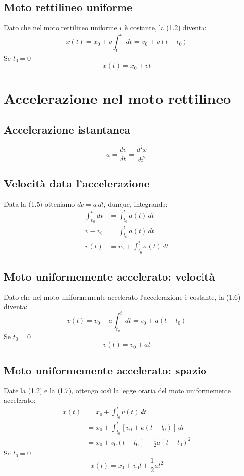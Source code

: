 \documentclass{report}
\begin{document}
\subsection{Moto rettilineo uniforme}
Dato che nel moto rettilineo uniforme \(v\) è costante, la (1.2) diventa:
\begin{equation}
    x(t) = x_0 + v \int_{t_0}^{t}\,dt = x_0 + v(t - t_0)
\end{equation}
Se \(t_0 = 0\)
\begin{equation*}
    x(t) = x_0 + vt
\end{equation*}

\section{Accelerazione nel moto rettilineo}
\subsection{Accelerazione istantanea}
\begin{equation}
    a = \frac{dv}{dt} = \frac{d^{2}x}{dt^2}
\end{equation}
\subsection{Velocità data l'accelerazione}
Data la (1.5) otteniamo \(dv = a\,dt\), dunque, integrando:
\begin{align}
    \int_{v_0}^{v}dv & = \int_{t_0}^{t}a(t)\,dt \nonumber \\
    v - v_0 & = \int_{t_0}^{t}a(t)\,dt \nonumber \\
    v(t) & = v_0 + \int_{t_0}^{t}a(t)\,dt
\end{align}
\subsection{Moto uniformemente accelerato: velocità}
Dato che nel moto uniformemente accelerato l'accelerazione è costante, 
la (1.6) diventa:
\begin{equation}
    v(t) = v_0 + a \int_{t_0}^{t}dt = v_0 + a(t-t_0)
\end{equation}
Se \(t_0 = 0\)
\begin{equation*}
    v(t) = v_0 + at
\end{equation*}
\subsection{Moto uniformemente accelerato: spazio}
Date la (1.2) e la (1.7), ottengo così la legge oraria del moto uniformemente accelerato:
\begin{align}
    x(t) & = x_0 + \int_{t_0}^{t}v(t)\,dt \nonumber \\
    & = x_0 + \int_{t_0}^{t}[v_0 + a(t - t_0)]\,dt \nonumber \\
    & = x_0 + v_0(t - t_0) + \frac{1}{2}a(t-t_0)^2
\end{align}
Se \(t_0 = 0\)
\begin{equation*}
    x(t) = x_0 + v_0 t + \frac{1}{2}at^2
\end{equation*}
\end{document}
